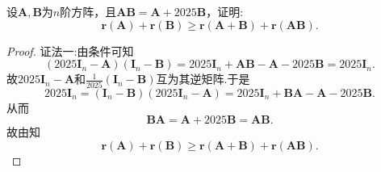 \documentclass[../../main.tex]{subfiles}%
\begin{document}
\begin{example}
设$\boldsymbol{A},\boldsymbol{B}$为$n$阶方阵，且$\boldsymbol{AB} = \boldsymbol{A} + 2025\boldsymbol{B}$，证明:
$$\mathbf{r}\left( \boldsymbol{A} \right) +\mathbf{r}\left( \boldsymbol{B} \right) \geqslant \mathbf{r}\left( \boldsymbol{A}+\boldsymbol{B} \right) +\mathbf{r}\left( \boldsymbol{AB} \right) .$$
\end{example}
\begin{proof}

{\color{blue}证法一:}由条件可知
$$\left( 2025\boldsymbol{I}_n-\boldsymbol{A} \right) \left( \boldsymbol{I}_n-\boldsymbol{B} \right) =2025\boldsymbol{I}_n+\boldsymbol{AB}-\boldsymbol{A}-2025\boldsymbol{B}=2025\boldsymbol{I}_n.$$
故$2025\boldsymbol{I}_n-\boldsymbol{A}$和$\frac{1}{2025}\left( \boldsymbol{I}_n-\boldsymbol{B} \right)$互为其逆矩阵.于是
$$2025\boldsymbol{I}_n=\left( \boldsymbol{I}_n-\boldsymbol{B} \right) \left( 2025\boldsymbol{I}_n-\boldsymbol{A} \right) =2025\boldsymbol{I}_n+\boldsymbol{BA}-\boldsymbol{A}-2025\boldsymbol{B}.$$
从而
$$\boldsymbol{BA}=\boldsymbol{A}+2025\boldsymbol{B}=\boldsymbol{AB}.$$
故由知
$$\mathbf{r}\left( \boldsymbol{A} \right) +\mathbf{r}\left( \boldsymbol{B} \right) \geqslant \mathbf{r}\left( \boldsymbol{A}+\boldsymbol{B} \right) +\mathbf{r}\left( \boldsymbol{AB} \right) .$$


\end{proof}
\end{document}
